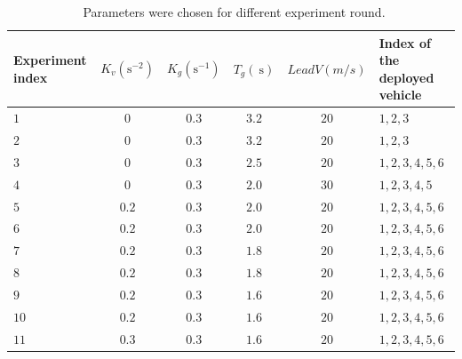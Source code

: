 \documentclass[a4paper]{cas-sc}
\begin{document}
\begin{table}
  \centering
  \setlength{\abovecaptionskip}{0pt}
  \setlength{\belowcaptionskip}{10pt}%
  \caption{~Parameters were chosen for different experiment round.}
  {\begin{tabular}{lccccl} \toprule
      Experiment index & $K_{v} (\mathrm{s}^{-2})$ & $K_{g} (\mathrm{s}^{-1})$ & $T_{g} (\mathrm{~s})$ & $LeadV (m/s)$ & Index of the deployed vehicle \\ \midrule
      $1 $             & $0$                       & $0.3 $                    & $3.2$                 & $20$          & $1,2,3$                       \\
      $2 $             & $0$                       & $0.3 $                    & $3.2$                 & $20$          & $1,2,3$                       \\
      $3 $             & $0$                       & $0.3 $                    & $2.5$                 & $20$          & $1,2,3,4,5,6$                 \\
      $4 $             & $0$                       & $0.3 $                    & $2.0$                 & $30$          & $1,2,3,4,5$                   \\
      $5 $             & $0.2$                     & $0.3 $                    & $2.0$                 & $20$          & $1,2,3,4,5,6$                 \\
      $6 $             & $0.2$                     & $0.3 $                    & $2.0$                 & $20$          & $1,2,3,4,5,6$                 \\
      $7 $             & $0.2$                     & $0.3 $                    & $1.8$                 & $20$          & $1,2,3,4,5,6$                 \\
      $8 $             & $0.2$                     & $0.3 $                    & $1.8$                 & $20$          & $1,2,3,4,5,6$                 \\
      $9 $             & $0.2$                     & $0.3 $                    & $1.6$                 & $20$          & $1,2,3,4,5,6$                 \\
      $10$             & $0.2$                     & $0.3 $                    & $1.6$                 & $20$          & $1,2,3,4,5,6$                 \\
      $11$             & $0.3$                     & $0.3 $                    & $1.6$                 & $20$          & $1,2,3,4,5,6$                 \\

\end{tabular}}
\end{table}
\end{document}

